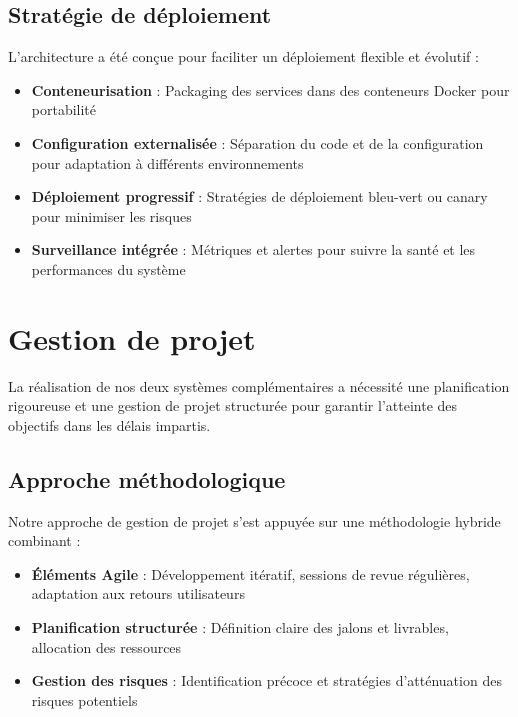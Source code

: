\subsection{Stratégie de déploiement}

L'architecture a été conçue pour faciliter un déploiement flexible et évolutif :

\begin{itemize}
  \item \textbf{Conteneurisation} : Packaging des services dans des conteneurs Docker pour portabilité
  
  \item \textbf{Configuration externalisée} : Séparation du code et de la configuration pour adaptation à différents environnements
  
  \item \textbf{Déploiement progressif} : Stratégies de déploiement bleu-vert ou canary pour minimiser les risques
  
  \item \textbf{Surveillance intégrée} : Métriques et alertes pour suivre la santé et les performances du système
\end{itemize}

\section{Gestion de projet}

La réalisation de nos deux systèmes complémentaires a nécessité une planification rigoureuse et une gestion de projet structurée pour garantir l'atteinte des objectifs dans les délais impartis.

\subsection{Approche méthodologique}

Notre approche de gestion de projet s'est appuyée sur une méthodologie hybride combinant :

\begin{itemize}
  \item \textbf{Éléments Agile} : Développement itératif, sessions de revue régulières, adaptation aux retours utilisateurs
  
  \item \textbf{Planification structurée} : Définition claire des jalons et livrables, allocation des ressources
  
  \item \textbf{Gestion des risques} : Identification précoce et stratégies d'atténuation des risques potentiels
\end{itemize}

